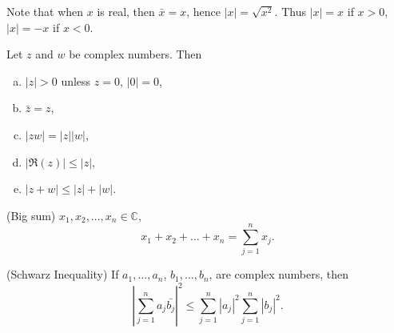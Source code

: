 Note that when $x$ is real, then $\bar{x} = x$, hence $|x| = \sqrt{x^2}$. Thus $|x| = x$
if $x>0$, $|x| = -x$ if $x <0$.

\begin{thm}
    \label{thm:1.33}
    Let $z$ and $w$ be complex numbers. Then
    \begin{enumerate}[(a)]
        \item $|z|>0$ unless $z=0$, $|0|=0$,
        \item $\bar{z}=z$,
        \item $|zw| = |z||w|$,
        \item $| \Re(z)| \leq |z|$,
        \item $|z+w| \leq|z|+|w|$.
    \end{enumerate}
\end{thm}


\begin{myNotation}(Big sum)
    \label{myNotation:1.34 sum}
    $x_1,x_2,\dots,x_n \in \mathbb{C}$,
    \begin{equation*}
        x_1+x_2+\dots+x_n = \sum_{j=1}^{n} x_j.
    \end{equation*}
\end{myNotation}

\begin{thm}(Schwarz Inequality)
    \label{thm:1.35 schwarz_inequality}
    If 
    $a_1,\dots,a_n$, 
    $b_1,\dots,b_n$, are complex numbers, then
    \begin{equation*}
        \left| \sum_{j=1}^{n}a_j \bar{b_j}\right|^2 \leq 
        \sum_{j=1}^{n}\left|a_j\right|^2
        \sum_{j=1}^{n}\left|b_j\right|^2.
    \end{equation*}    
\end{thm}


